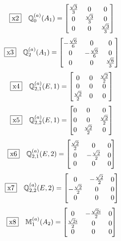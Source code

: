 \documentclass[fleqn,10pt,landscape]{jsarticle}
\begin{document}
\begin{dmath*}
\fbox{x2}\quad \mathbb{Q}_{0}^{(a)}(A_{1})=\begin{bmatrix} \frac{\sqrt{3}}{3} & 0 & 0 \\ 0 & \frac{\sqrt{3}}{3} & 0 \\ 0 & 0 & \frac{\sqrt{3}}{3} \end{bmatrix}
\end{dmath*}
\begin{dmath*}
\fbox{x3}\quad \mathbb{Q}_{2}^{(a)}(A_{1})=\begin{bmatrix} - \frac{\sqrt{6}}{6} & 0 & 0 \\ 0 & - \frac{\sqrt{6}}{6} & 0 \\ 0 & 0 & \frac{\sqrt{6}}{3} \end{bmatrix}
\end{dmath*}
\begin{dmath*}
\fbox{x4}\quad \mathbb{Q}_{2,1}^{(a)}(E,1)=\begin{bmatrix} 0 & 0 & \frac{\sqrt{2}}{2} \\ 0 & 0 & 0 \\ \frac{\sqrt{2}}{2} & 0 & 0 \end{bmatrix}
\end{dmath*}
\begin{dmath*}
\fbox{x5}\quad \mathbb{Q}_{2,2}^{(a)}(E,1)=\begin{bmatrix} 0 & 0 & 0 \\ 0 & 0 & \frac{\sqrt{2}}{2} \\ 0 & \frac{\sqrt{2}}{2} & 0 \end{bmatrix}
\end{dmath*}
\begin{dmath*}
\fbox{x6}\quad \mathbb{Q}_{2,1}^{(a)}(E,2)=\begin{bmatrix} \frac{\sqrt{2}}{2} & 0 & 0 \\ 0 & - \frac{\sqrt{2}}{2} & 0 \\ 0 & 0 & 0 \end{bmatrix}
\end{dmath*}
\begin{dmath*}
\fbox{x7}\quad \mathbb{Q}_{2,2}^{(a)}(E,2)=\begin{bmatrix} 0 & - \frac{\sqrt{2}}{2} & 0 \\ - \frac{\sqrt{2}}{2} & 0 & 0 \\ 0 & 0 & 0 \end{bmatrix}
\end{dmath*}
\begin{dmath*}
\fbox{x8}\quad \mathbb{M}_{1}^{(a)}(A_{2})=\begin{bmatrix} 0 & - \frac{\sqrt{2} i}{2} & 0 \\ \frac{\sqrt{2} i}{2} & 0 & 0 \\ 0 & 0 & 0 \end{bmatrix}
\end{dmath*}
\end{document}
